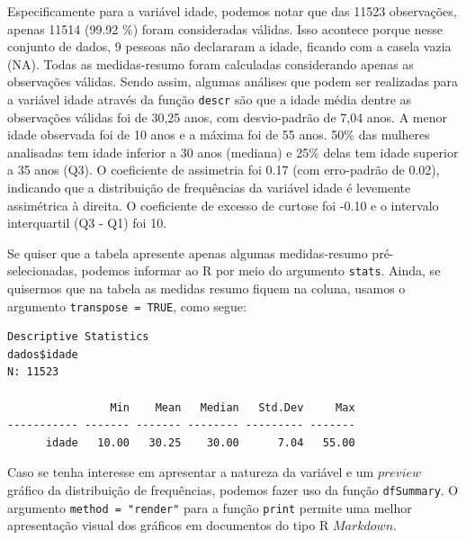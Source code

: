 \documentclass[
  letterpaper,
  DIV=11,
  numbers=noendperiod]{scrreprt}
\newenvironment{Shaded}{\begin{snugshade}}{\end{snugshade}}
\newcommand{\AttributeTok}[1]{\textcolor[rgb]{0.40,0.45,0.13}{#1}}
\newcommand{\CommentTok}[1]{\textcolor[rgb]{0.37,0.37,0.37}{#1}}
\newcommand{\ConstantTok}[1]{\textcolor[rgb]{0.56,0.35,0.01}{#1}}
\newcommand{\FunctionTok}[1]{\textcolor[rgb]{0.28,0.35,0.67}{#1}}
\newcommand{\NormalTok}[1]{\textcolor[rgb]{0.00,0.23,0.31}{#1}}
\newcommand{\SpecialCharTok}[1]{\textcolor[rgb]{0.37,0.37,0.37}{#1}}
\newcommand{\StringTok}[1]{\textcolor[rgb]{0.13,0.47,0.30}{#1}}
\begin{document}
Especificamente para a variável idade, podemos notar que das 11523
observações, apenas 11514 (99.92 \%) foram consideradas válidas. Isso
acontece porque nesse conjunto de dados, 9 pessoas não declararam a
idade, ficando com a casela vazia (NA). Todas as medidas-resumo foram
calculadas considerando apenas as observações válidas. Sendo assim,
algumas análises que podem ser realizadas para a variável idade através
da função \texttt{descr} são que a idade média dentre as observações
válidas foi de 30,25 anos, com desvio-padrão de 7,04 anos. A menor idade
observada foi de 10 anos e a máxima foi de 55 anos. 50\% das mulheres
analisadas tem idade inferior a 30 anos (mediana) e 25\% delas tem idade
superior a 35 anos (Q3). O coeficiente de assimetria foi 0.17 (com
erro-padrão de 0.02), indicando que a distribuição de frequências da
variável idade é levemente assimétrica à direita. O coeficiente de
excesso de curtose foi -0.10 e o intervalo interquartil (Q3 - Q1) foi
10.

Se quiser que a tabela apresente apenas algumas medidas-resumo
pré-selecionadas, podemos informar ao R por meio do argumento
\texttt{stats}. Ainda, se quisermos que na tabela as medidas resumo
fiquem na coluna, usamos o argumento \texttt{transpose\ =\ TRUE}, como
segue:

\begin{Shaded}
\end{Shaded}

\begin{verbatim}
Descriptive Statistics  
dados$idade  
N: 11523  

                Min    Mean   Median   Std.Dev     Max
----------- ------- ------- -------- --------- -------
      idade   10.00   30.25    30.00      7.04   55.00
\end{verbatim}

Caso se tenha interesse em apresentar a natureza da variável e um
\(preview\) gráfico da distribuição de frequências, podemos fazer uso da
função \texttt{dfSummary}. O argumento \texttt{method\ =\ "render"} para
a função \texttt{print} permite uma melhor apresentação visual dos
gráficos em documentos do tipo R \(Markdown\).
\end{document}
